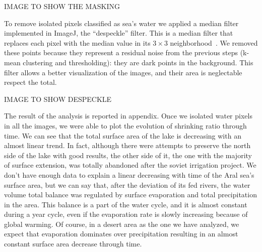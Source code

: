 IMAGE TO SHOW THE MASKING 

To remove isolated pixels classified as sea’s water we applied a median filter implemented in ImageJ, the “despeckle” filter. 
This is a median filter that replaces each pixel with the median value in its $3 \times 3$ neighborhood~\cite{despeckle}.
We removed these points because they represent a residual noise from the previous steps (k-mean clustering and thresholding): they are dark points in the background. 
This filter allows a better visualization of the images, and their area is neglectable respect the total.  

IMAGE TO SHOW DESPECKLE 

The result of the analysis is reported in appendix. 
Once we isolated water pixels in all the images, we were able to plot the evolution of shrinking ratio through time. 
We can see that the total surface area of the lake is decreasing with an almost linear trend. 
In fact, although there were attempts to preserve the north side of the lake with good results, the other side of it, the one with the majority of surface extension, was totally abandoned after the soviet irrigation project. 
We don’t have enough data to explain a linear decreasing with time of the Aral sea’s surface area, but we can say that, after the deviation of its fed rivers, the water volume total balance was regulated by surface evaporation and total precipitation in the area. 
This balance is a part of the water cycle, and it is almost constant during a year cycle, even if the evaporation rate is slowly increasing because of global warming. 
Of course, in a desert area as the one we have analyzed, we expect that evaporation dominates over precipitation resulting in an almost constant surface area decrease through time.  

\begin{figure}[ht!]
    \centering
    \scalebox{.7}{}
    \caption{\emph{}}
    \label{fig:expo}
\end{figure}

